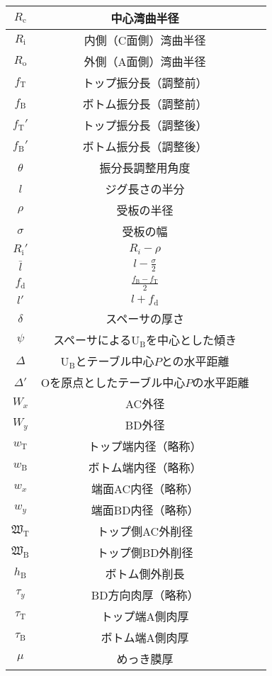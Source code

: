 \begin{longtable}{|c|Sl|}
$R_\mathrm c$ & 中心湾曲半径\\\hline
$R_\mathrm i$ & 内側（C面側）湾曲半径\\\hline
$R_\mathrm o$ & 外側（A面側）湾曲半径\\\hline
$f_\mathrm T$ & トップ振分長（調整前）\\\hline
$f_\mathrm B$ & ボトム振分長（調整前）\\\hline
$f_\mathrm T'$ & トップ振分長（調整後）\\\hline
$f_\mathrm B'$ & ボトム振分長（調整後）\\\hline
$\theta$ & 振分長調整用角度\\\hline
$l$ & ジグ長さの半分\\\hline
$\rho$ & 受板の半径\\\hline
$\sigma$ & 受板の幅\\\hline
$R_\mathrm i'$ & $R_i-\rho$\\\hline
$\bar l$ & $\displaystyle l-\frac\sigma2$\\\hline
$f_\mathrm d$ & $\displaystyle \frac{f_\mathrm B-f_\mathrm T}2$\\\hline
$l'$ & $l+f_\mathrm d$\\\hline
$\delta$ & スペーサの厚さ\\\hline
$\psi$ & スペーサによる$\mathrm U_\mathrm B$を中心とした傾き\\\hline
$\varDelta$ & $\mathrm U_\mathrm B$とテーブル中心$P$との水平距離\\\hline
$\varDelta'$ & Oを原点としたテーブル中心$P$の水平距離\\\hline
$W_x$ & AC外径\\\hline
$W_y$ & BD外径\\\hline
$w_\mathrm T$ & トップ端内径（略称）\\\hline
$w_\mathrm B$ & ボトム端内径（略称）\\\hline
$w_x$ & 端面AC内径（略称）\\\hline
$w_y$ & 端面BD内径（略称）\\\hline
$\mathfrak W_\mathrm T$ & トップ側AC外削径\\\hline
$\mathfrak W_\mathrm B$ & トップ側BD外削径\\\hline
$h_\mathrm B$ & ボトム側外削長\\\hline
$\tau_y$ & BD方向肉厚（略称）\\\hline
$\tau_\mathrm T$ & トップ端A側肉厚\\\hline
$\tau_\mathrm B$ & ボトム端A側肉厚\\\hline
$\mu$ & めっき膜厚\\\hline

\end{longtable}

